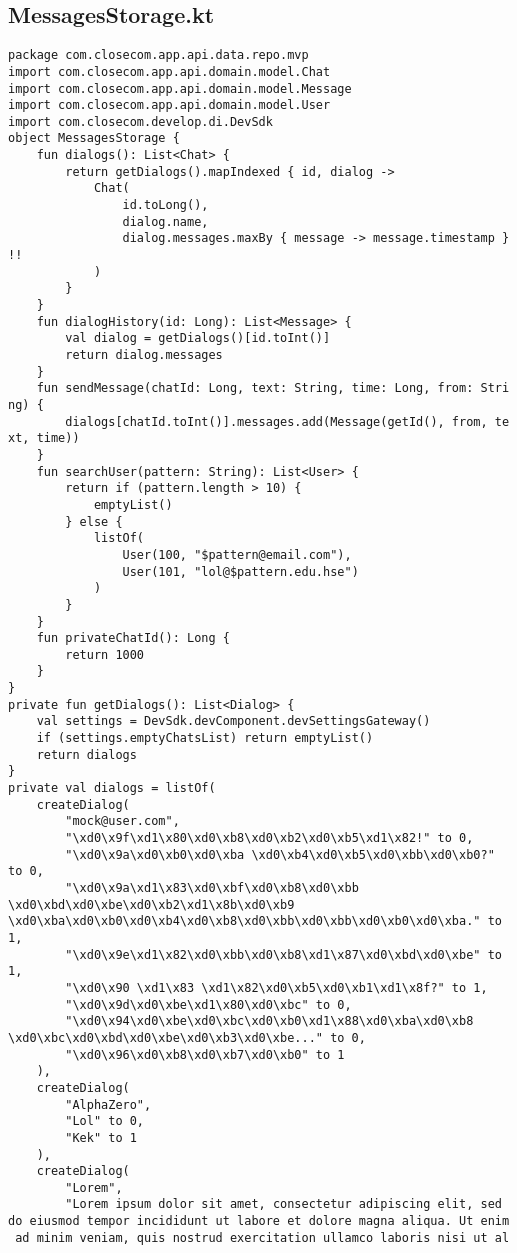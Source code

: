 \documentclass[listing]{espd}
\begin{document}
\subsection{MessagesStorage.kt}
\begin{verbatim}
package com.closecom.app.api.data.repo.mvp
import com.closecom.app.api.domain.model.Chat
import com.closecom.app.api.domain.model.Message
import com.closecom.app.api.domain.model.User
import com.closecom.develop.di.DevSdk
object MessagesStorage {
    fun dialogs(): List<Chat> {
        return getDialogs().mapIndexed { id, dialog ->
            Chat(
                id.toLong(),
                dialog.name,
                dialog.messages.maxBy { message -> message.timestamp }
!!
            )
        }
    }
    fun dialogHistory(id: Long): List<Message> {
        val dialog = getDialogs()[id.toInt()]
        return dialog.messages
    }
    fun sendMessage(chatId: Long, text: String, time: Long, from: Stri
ng) {
        dialogs[chatId.toInt()].messages.add(Message(getId(), from, te
xt, time))
    }
    fun searchUser(pattern: String): List<User> {
        return if (pattern.length > 10) {
            emptyList()
        } else {
            listOf(
                User(100, "$pattern@email.com"),
                User(101, "lol@$pattern.edu.hse")
            )
        }
    }
    fun privateChatId(): Long {
        return 1000
    }
}
private fun getDialogs(): List<Dialog> {
    val settings = DevSdk.devComponent.devSettingsGateway()
    if (settings.emptyChatsList) return emptyList()
    return dialogs
}
private val dialogs = listOf(
    createDialog(
        "mock@user.com",
        "\xd0\x9f\xd1\x80\xd0\xb8\xd0\xb2\xd0\xb5\xd1\x82!" to 0,
        "\xd0\x9a\xd0\xb0\xd0\xba \xd0\xb4\xd0\xb5\xd0\xbb\xd0\xb0?" to 0,
        "\xd0\x9a\xd1\x83\xd0\xbf\xd0\xb8\xd0\xbb \xd0\xbd\xd0\xbe\xd0\xb2\xd1\x8b\xd0\xb9 \xd0\xba\xd0\xb0\xd0\xb4\xd0\xb8\xd0\xbb\xd0\xbb\xd0\xb0\xd0\xba." to 1,
        "\xd0\x9e\xd1\x82\xd0\xbb\xd0\xb8\xd1\x87\xd0\xbd\xd0\xbe" to 1,
        "\xd0\x90 \xd1\x83 \xd1\x82\xd0\xb5\xd0\xb1\xd1\x8f?" to 1,
        "\xd0\x9d\xd0\xbe\xd1\x80\xd0\xbc" to 0,
        "\xd0\x94\xd0\xbe\xd0\xbc\xd0\xb0\xd1\x88\xd0\xba\xd0\xb8 \xd0\xbc\xd0\xbd\xd0\xbe\xd0\xb3\xd0\xbe..." to 0,
        "\xd0\x96\xd0\xb8\xd0\xb7\xd0\xb0" to 1
    ),
    createDialog(
        "AlphaZero",
        "Lol" to 0,
        "Kek" to 1
    ),
    createDialog(
        "Lorem",
        "Lorem ipsum dolor sit amet, consectetur adipiscing elit, sed 
do eiusmod tempor incididunt ut labore et dolore magna aliqua. Ut enim
 ad minim veniam, quis nostrud exercitation ullamco laboris nisi ut al

\end{verbatim}
\end{document}

